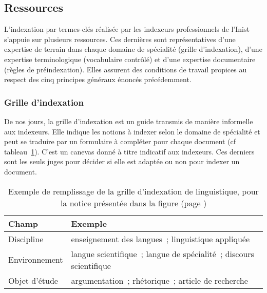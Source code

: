     \subsection{Ressources}
    \label{subsec:main-domain_specific_keyphrase_annotation-manual_keyphrase_annotation-resources}
      L'indexation par termes-clés réalisée par les indexeurs professionnels de
      l'Inist s'appuie sur plusieurs ressources. Ces dernières sont
      représentatives d'une expertise de terrain dans chaque domaine de
      spécialité (grille d'indexation), d'une expertise terminologique
      (vocabulaire contrôlé) et d'une expertise documentaire (règles de
      préindexation). Elles assurent des conditions de travail propices
      au respect des cinq principes généraux énoncés précédemment.

      \subsubsection{Grille d'indexation}
      \label{subsubsec:main-domain_specific_keyphrase_annotation-manual_keyphrase_annotation-resources-indexing_guidelines}
        De nos jours, la grille d'indexation est un guide transmis de manière
        informelle aux indexeurs. Elle indique les notions à indexer selon le
        domaine de spécialité et peut se traduire par un formulaire à compléter
        pour chaque document (cf tableau~\ref{fig:indexing_grid}). C'est un
        canevas donné à titre indicatif aux indexeurs. Ces derniers sont les
        seuls juges pour décider si elle est adaptée ou non pour indexer un
        document.
        \begin{table}[h!]
          \centering
          \begin{tabular}{l|l}
            \toprule
            \textbf{Champ} & \textbf{Exemple}\\
            \hline
            Discipline & enseignement des langues~; linguistique appliquée\\
            Environnement & langue scientifique~; langue de spécialité~; discours scientifique\\
            Objet d'étude & argumentation~; rhétorique~; article de recherche\\
            \bottomrule
          \end{tabular}
          \caption[
            Exemple de remplissage de la grille d'indexation de linguistique
          ]{
            Exemple de remplissage de la grille d'indexation de linguistique,
            pour la notice présentée dans la figure  (page
            ) 
            \label{fig:indexing_grid}
          }
        \end{table}

